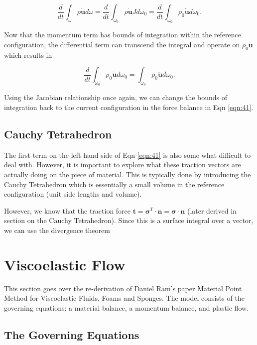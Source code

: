 \documentclass[a4paper]{article}
\begin{document}
\begin{equation}
    \frac{d}{dt}\int_\omega \rho \dot{\mathbf{u}} d\omega = \frac{d}{dt}\int_{\omega_0} \rho \dot{\mathbf{u}} J d\omega_0 = \frac{d}{dt} \int_{\omega_0} \rho_0 \dot{\mathbf{u}} d\omega_0 .
\end{equation}

Now that the momentum term has bounds of integration within the reference configuration, the differential term can transcend the integral and operate on $\rho_0 \dot{\mathbf{u}}$ which results in

\begin{equation}
    \frac{d}{dt} \int_{\omega_0} \rho_0 \dot{\mathbf{u}} d\omega_0 =  \int_{\omega_0} \rho_0 \ddot{\mathbf{u}} d\omega_0. 
\end{equation}

Using the Jacobian relationship once again, we can change the bounds of integration back to the current configuration in the force balance in Eqn \ref{eqn:41}. 

\subsection{Cauchy Tetrahedron}
The first term on the left hand side of Eqn \ref{eqn:41} is also some what difficult to deal with. However, it is important to explore what these traction vectors are actually doing on the piece of material. This is typically done by introducing the Cauchy Tetrahedron which is essentially a small volume in the reference configuration (unit side lengths and volume). 

However, we know that the traction force $\mathbf{t} = \boldsymbol{\sigma}^T \cdot \mathbf{n} = \boldsymbol{\sigma} \cdot \mathbf{n}$ (later derived in section on the Cauchy Tetrahedron). Since this is a surface integral over a vector, we can use the divergence theorem


\section{Viscoelastic Flow}

This section goes over the re-derivation of Daniel Ram's paper Material Point Method for Viscoelastic Fluids, Foams and Sponges. The model consists of the governing equations: a material balance, a momentum balance, and plastic flow. 

\subsection{The Governing Equations}
\end{document}

